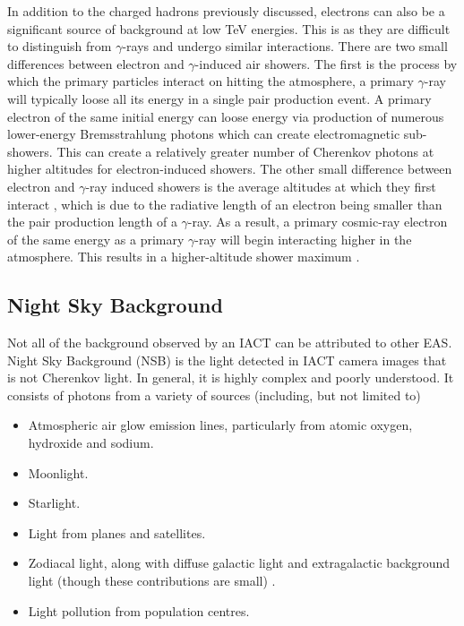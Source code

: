 In addition to the charged hadrons previously discussed, electrons can also be a significant source of background at low TeV energies. This is as they are difficult to distinguish from $\gamma$-rays and undergo similar interactions. There are two small differences between electron and $\gamma$-induced air showers. The first is the process by which the primary particles interact on hitting the atmosphere, a primary $\gamma$-ray will typically loose all its energy in a single pair production event. A primary electron of the same initial energy can loose energy via production of numerous lower-energy Bremsstrahlung photons which can create electromagnetic sub-showers. This can create a relatively greater number of Cherenkov photons at higher altitudes for electron-induced showers. The other small difference between electron and $\gamma$-ray induced showers is the average altitudes at which they first interact \cite{Sitarek1i}, which is due to the radiative length of an electron being smaller than the pair production length of a $\gamma$-ray. As a result, a primary cosmic-ray electron of the same energy as a primary $\gamma$-ray will begin interacting higher in the atmosphere. This results in a higher-altitude shower maximum \cite{lypova}. 

\subsection{Night Sky Background}
Not all of the background observed by an IACT can be attributed to other EAS. Night Sky Background (NSB) is the light detected in IACT camera images that is not Cherenkov light. In general, it is highly complex and poorly understood. It consists of photons from a variety of sources (including, but not limited to)

\begin{itemize}
    \item Atmospheric air glow emission lines, particularly from atomic oxygen, hydroxide and sodium.
    \item Moonlight.
    \item Starlight.
    \item Light from planes and satellites.
    \item Zodiacal light, along with diffuse galactic light and extragalactic background light (though these contributions are small) \cite{nsbref}.
    \item Light pollution from population centres.
\end{itemize}

